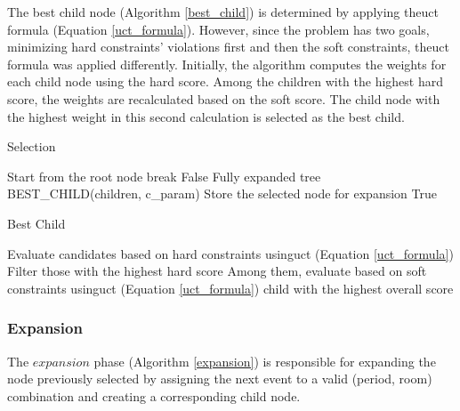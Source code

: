 The best child node (Algorithm \ref{best_child}) is determined by applying the\ac{uct} formula (Equation \ref{uct_formula}). However, since the problem has two goals, minimizing hard constraints' violations first and then the soft constraints, the\ac{uct} formula was applied differently. Initially, the algorithm computes the weights for each child node using the hard score. Among the children with the highest hard score, the weights are recalculated based on the soft score. The child node with the highest weight in this second calculation is selected as the best child. %

\begin{algorithm}
\caption{Selection}\label{selection}
\begin{algorithmic}[1]
	\State Start from the root node
				\State break
			\Else
					\State \Return False \Comment Fully expanded tree
            			\Else
                			\State BEST\_CHILD(children, c\_param)
				\EndIf
			\EndIf
	\EndWhile
	\State Store the selected node for expansion
	\State \Return True
\EndFunction
\end{algorithmic}
\end{algorithm}


\begin{algorithm}
\caption{Best Child}\label{best_child}
\begin{algorithmic}[1]
    \State Evaluate candidates based on hard constraints using\ac{uct} (Equation \ref{uct_formula})
    \State Filter those with the highest hard score
    \State Among them, evaluate based on soft constraints using\ac{uct} (Equation \ref{uct_formula})
    \State \Return child with the highest overall score
\EndFunction
\end{algorithmic}
\end{algorithm}

\subsubsection{Expansion}

The \(expansion\) phase (Algorithm \ref{expansion}) is responsible for expanding the node previously selected by assigning the next event to a valid (period, room) combination and creating a corresponding child node.

